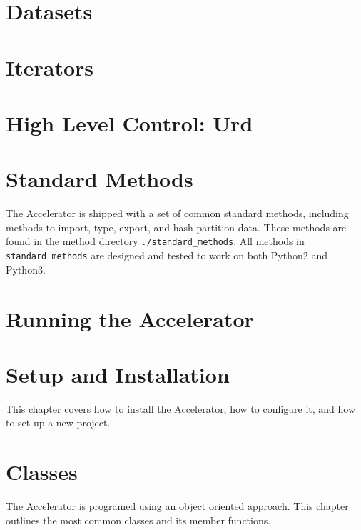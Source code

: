 \documentclass[a4paper]{report}
\begin{document}
\chapter{Datasets}


\chapter{Iterators}


\chapter{High Level Control:  Urd}


\chapter{Standard Methods}
The Accelerator is shipped with a set of common standard methods,
including methods to import, type, export, and hash partition data.
These methods are found in the method
directory \texttt{./standard\_methods}.  All methods
in \texttt{standard\_methods} are designed and tested to work on both
Python2 and Python3.



\chapter{Running the Accelerator}



\appendix


\chapter{Setup and Installation}
This chapter covers how to install the Accelerator, how to configure
it, and how to set up a new project.



\chapter{Classes}
The Accelerator is programed using an object oriented approach.  This
chapter outlines the most common classes and its member functions.






\end{document}
